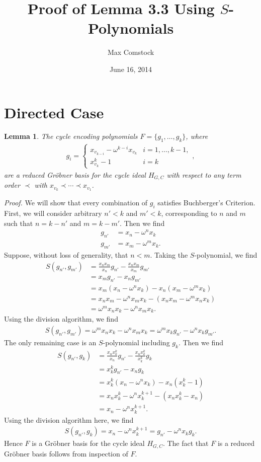 \documentclass[letterpaper]{article}
\title{Proof of Lemma 3.3 Using $S$-Polynomials}
\author{Max Comstock}
\date{June 16, 2014}
\newtheorem*{lemma}{Lemma}
\newcommand{\aln}[1]{\begin{align*} #1 \end{align*}} %
\begin{document}
\maketitle

\section{Directed Case}
\begin{lemma}
  The cycle encoding polynomials $F = \{g_1, \ldots, g_k\}$, where
  \aln{
    g_i = \left\{\begin{array}{ll} x_{v_{k-i}} - \omega^{k-i} x_{v_k} & i = 1,\ldots,k-1,\\
                                x_{v_k}^k - 1 & i = k \end{array} \right.,
  }
  are a reduced Gr\"obner basis for the cycle ideal $H_{G,C}$ with respect to any term order $\prec$ with $x_{v_k} \prec \cdots \prec x_{v_1}$.
\end{lemma}
\noindent \textit{Proof.} We will show that every combination of $g_i$ satisfies Buchberger's Criterion. First, we will consider arbitrary $n' < k$ and $m' < k$, corresponding to $n$ and $m$ such that $n = k - n'$ and $m = k - m'$. Then we find
\aln{
  g_{n'} &= x_n - \omega^n x_k\\
  g_{m'} &= x_m - \omega^m x_k.
}
Suppose, without loss of generality, that $n < m$. Taking the $S$-polynomial, we find
\aln{
  S(g_{n'}, g_{m'}) &= \frac{x_n x_m}{x_n} g_{n'} - \frac{x_n x_m}{x_m} g_{m'}\\
  &= x_m g_{n'} - x_n g_{m'}\\
  &= x_m (x_n - \omega^n x_k) - x_n (x_m - \omega^m x_k)\\
  &= x_n x_m - \omega^n x_m x_k - (x_n x_m - \omega^m x_n x_k)\\
  &= \omega^m x_n x_k - \omega^n x_m x_k.
}
Using the division algorithm, we find
\aln{
  S(g_{n'}, g_{m'}) = \omega^m x_n x_k - \omega^n x_m x_k = \omega^m x_k g_{n'} - \omega^n x_k g_{m'}.
}
The only remaining case is an $S$-polynomial including $g_k$. Then we find
\aln{
  S(g_{n'}, g_k) &= \frac{x_n x_k^k}{x_n} g_{n'} - \frac{x_n x_k^k}{x_k^k} g_k\\
  &= x_k^k g_{n'} - x_n g_k\\
  &= x_k^k (x_n - \omega^n x_k) - x_n (x_k^k - 1)\\
  &= x_n x_k^k - \omega^n x_k^{k+1} - (x_n x_k^k - x_n)\\
  &= x_n - \omega^n x_k^{k+1}.
}
Using the division algorithm here, we find
\aln{
  S(g_{n'}, g_k) = x_n - \omega^n x_k^{k+1} = g_{n'} - \omega^n x_k g_k.
}
Hence $F$ is a Gr\"obner basis for the cycle ideal $H_{G,C}$. The fact that $F$ is a reduced Gr\"obner basis follows from inspection of $F$.
\end{document}
